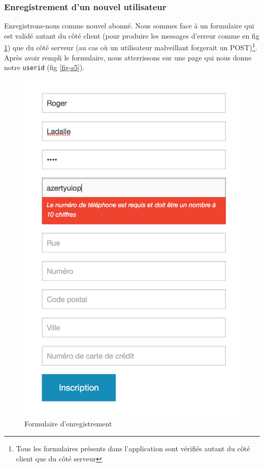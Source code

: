 \documentclass[a4paper]{article}
\begin{document}
    \subsubsection{Enregistrement d'un nouvel utilisateur}
    Enregistrons-nous comme nouvel abonné. Nous sommes face à un formulaire qui est validé autant du côté client (pour produire les messages d'erreur comme en fig \ref{fig-s4}) que du côté serveur (au cas où un utilisateur malveillant forgerait un POST)\footnote{Tous les formulaires présents dans l'application sont vérifiés autant du côté client que du côté serveur}. Après avoir rempli le formulaire, nous atterrissons sur une page qui nous donne notre \texttt{userid} (fig \ref{fig-s5}). 
    
    \begin{figure}
    \begin{center}
    \includegraphics[width=\textwidth/2]{images/s4.png}
    \end{center}
    \caption{Formulaire d'enregistrement}
    \label{fig-s4}
    \end{figure}
    
\end{document}
